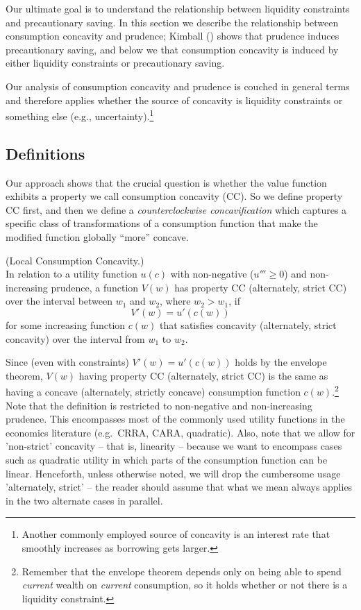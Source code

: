 
  Our ultimate goal is to understand the relationship between liquidity constraints and precautionary saving. In this section we describe the relationship between consumption concavity and prudence; Kimball (\citeyear{kimball:smallandlarge}) shows that prudence induces precautionary saving, and below we that consumption concavity is induced by either liquidity constraints or precautionary saving.

  Our analysis of consumption concavity and prudence is couched in general terms and therefore applies whether the source of concavity is liquidity constraints or something else (e.g., uncertainty).\footnote{Another commonly employed source of concavity is an interest rate that smoothly increases as borrowing gets larger.}



\subsection{Definitions}
Our approach shows that the crucial question is whether the value function exhibits a property we call consumption concavity (CC). So we define property CC first, and then we define a \textit{counterclockwise concavification} which captures a specific class of transformations of a consumption function that make the modified function globally ``more'' concave.

\begin{defn}\label{defn:IntervalStrictCC} (Local Consumption Concavity.) \\ In relation to a
	utility function $u(c)$ with non-negative ($u''' \geq 0$) and non-increasing prudence, a function $V(w)$ has property CC (alternately, strict CC) over the
	interval between $w_{1}$ and $w_{2}$, where $w_2 >w_{1}$, if
	\[
	V'(w) = u'(c(w))
	\]
	for some increasing function $c(w)$ that satisfies concavity (alternately, strict concavity) over the interval from $w_{1}$ to $w_{2}$.
\end{defn}
Since (even with constraints) $V'(w) = u'(c(w))$ holds by the envelope theorem, $V(w)$ having property CC (alternately, strict CC) is the same as having a concave (alternately, strictly concave) consumption function $c(w)$.\footnote{Remember that the envelope theorem depends only on being able to spend \textit{current} wealth on \textit{current} consumption, so it holds whether or not there is a 	liquidity constraint.} Note that the definition is restricted to non-negative and non-increasing prudence. This encompasses most of the commonly used utility functions in the economics literature (e.g.\ CRRA, CARA, quadratic). Also, note that we allow for 'non-strict' concavity -- that is, linearity -- because we want to encompass cases such as quadratic utility in which parts of the consumption function can be linear.  Henceforth, unless otherwise noted, we will drop the cumbersome usage 'alternately, strict' -- the reader should assume that what we mean always applies in the two alternate cases in parallel.

